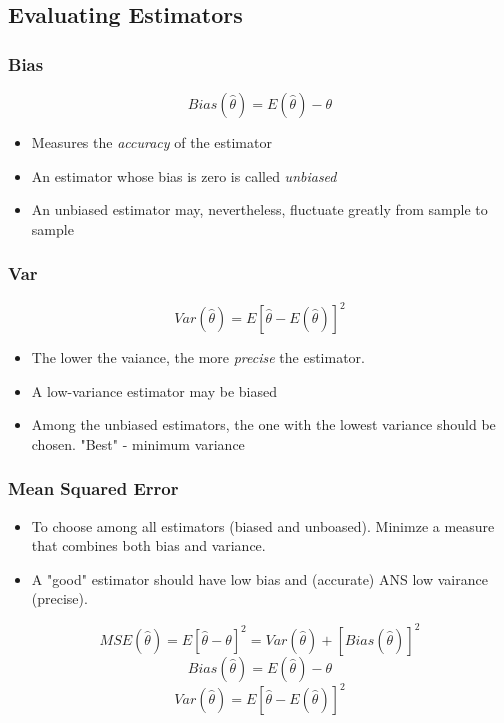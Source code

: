 \documentclass[12pt]{article}
\begin{document}
\subsection*{Evaluating Estimators \cite{classnotes.18}}
\subsubsection*{Bias}
$$Bias(\hat{\theta})=E(\hat{\theta})-\theta$$

\begin{itemize}
\item Measures the \emph{accuracy} of the estimator
\item An estimator whose bias is zero is called \emph{unbiased}
\item An unbiased estimator may, nevertheless, fluctuate greatly from sample to sample
\end{itemize}

\subsubsection*{Var}
$$Var(\hat{\theta})=E{[\hat{\theta}-E(\hat{\theta})]^2}$$

\begin{itemize}
\item The lower the vaiance, the more \emph{precise} the estimator.
\item A low-variance estimator may be biased
\item Among the unbiased estimators, the one with the lowest variance should be chosen. "Best" - minimum variance
\end{itemize}

\subsubsection*{Mean Squared Error}
\begin{itemize}
\item To choose among all estimators (biased and unboased). Minimze a measure that combines both bias and variance.
\item A "good" estimator should have low bias and (accurate) ANS low vairance (precise).
\end{itemize}
$$MSE(\hat{\theta})=E{[\hat{\theta}-\theta]^2}=Var(\hat{\theta})+[Bias(\hat{\theta})]^2$$
$$Bias(\hat{\theta})=E(\hat{\theta})-\theta$$
$$Var(\hat{\theta})=E{[\hat{\theta}-E(\hat{\theta})]^2}$$
\end{document}
